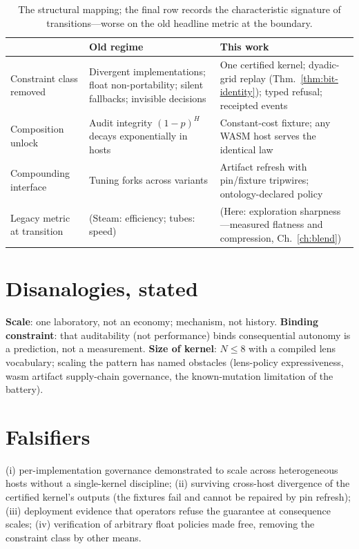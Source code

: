 \documentclass[12pt,oneside]{report}
\theoremstyle{plain}
\theoremstyle{definition}
\theoremstyle{remark}
\begin{document}
\begin{table}[h]
\centering
\small
\begin{tabular}{p{}p{}p{}}
\toprule
 & \textbf{Old regime} & \textbf{This work} \\
\midrule
Constraint class removed & Divergent implementations; float
non-portability; silent fallbacks; invisible decisions & One certified
kernel; dyadic-grid replay (Thm.~\ref{thm:bit-identity}); typed
refusal; receipted events \\
Composition unlock & Audit integrity $(1-p)^H$ decays exponentially in
hosts & Constant-cost fixture; any WASM host serves the identical law \\
Compounding interface & Tuning forks across variants & Artifact refresh
with pin/fixture tripwires; ontology-declared policy \\
Legacy metric at transition & (Steam: efficiency; tubes: speed) &
(Here: exploration sharpness---measured flatness and compression,
Ch.~\ref{ch:blend}) \\
\bottomrule
\end{tabular}
\caption{The structural mapping; the final row records the
characteristic signature of transitions---worse on the old headline
metric at the boundary.}
\label{tab:mapping}
\end{table}

\section{Disanalogies, stated}

\textbf{Scale}: one laboratory, not an economy; mechanism, not
history. \textbf{Binding constraint}: that auditability (not
performance) binds consequential autonomy is a prediction, not a
measurement. \textbf{Size of kernel}: $N\le 8$ with a compiled lens
vocabulary; scaling the pattern has named obstacles (lens-policy
expressiveness, wasm artifact supply-chain governance, the
known-mutation limitation of the battery).

\section{Falsifiers}

(i) per-implementation governance demonstrated to scale across
heterogeneous hosts without a single-kernel discipline; (ii) surviving
cross-host divergence of the certified kernel's outputs (the fixtures
fail and cannot be repaired by pin refresh); (iii) deployment evidence
that operators refuse the guarantee at consequence scales;
(iv) verification of arbitrary float policies made free, removing the
constraint class by other means.
\end{document}
